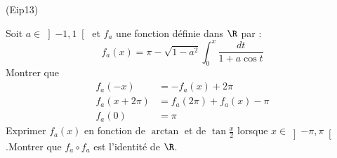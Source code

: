 \begin{tiny}(Eip13)\end{tiny}
Soit $a\in \left] -1,1\right[ $ et $f_{a}$ une fonction d{\'e}finie dans $\R$ par :
\[
f_{a}(x)=\pi -\sqrt{1-a^{2}}\int_{0}^{x}\frac{dt}{1+a\cos t}
\]
Montrer que 
\begin{align*}
 f_{a}(-x) &=-f_{a}(x)+2\pi \\
f_{a}(x+2\pi) &=f_{a}(2\pi )+f_{a}(x)-\pi \\
f_{a}(0) &=\pi 
\end{align*}
Exprimer $f_a(x)$ en fonction de $\arctan $ et de $\tan \frac{x}{2}$ lorsque $x\in \left] -\pi ,\pi \right[ $.\newline Montrer que $f_a \circ f_a$ est l'identité de $\R$.